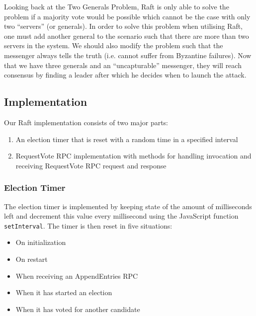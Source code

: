 Looking back at the Two Generals Problem, Raft is only able to solve the problem if a majority vote would be possible which cannot be the case with only two ``servers'' (or generals). In order to solve this problem when utilising Raft, one must add another general to the scenario such that there are more than two servers in the system. We should also modify the problem such that the messenger always tells the truth (i.e. cannot suffer from Byzantine failures). Now that we have three generals and an ``uncapturable'' messenger, they will reach consensus by finding a leader after which he decides when to launch the attack.



\subsection{Implementation} %
\label{sub:leader_election_implementation}

Our Raft implementation consists of two major parts:

\begin{enumerate}
  \item An election timer that is reset with a random time in a specified interval
  \item RequestVote RPC implementation with methods for handling invocation and receiving RequestVote RPC request and response
\end{enumerate}

\subsubsection{Election Timer} %
\label{ssub:election_timer}

The election timer is implemented by keeping state of the amount of milliseconds left and decrement this value every millisecond using the JavaScript function \verb$setInterval$. The timer is then reset in five situations:

\begin{itemize}
  \item On initialization
  \item On restart
  \item When receiving an AppendEntries RPC
  \item When it has started an election
  \item When it has voted for another candidate
\end{itemize}


